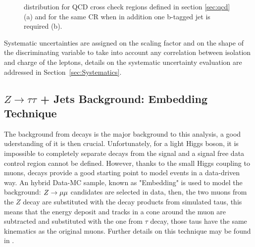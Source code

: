 \begin{figure}[tp]
	\begin{center}
	     
	
	\end{center}
	\caption{\mmc distribution for QCD cross check regions defined in section \ref{sec:qcd} (a) and for the same CR when in addition one b-tagged jet is required (b). }
	\label{fig:ABCD_cr}
\end{figure}


Systematic uncertainties are assigned on the scaling factor \rqcd and on the shape of
the discriminating variable \mmc to take into account any correlation between isolation and charge 
of the leptons, details on the systematic uncertainty evaluation are addressed in Section~\ref{sec:Systematics}.





\subsection{$Z \rightarrow \tau\tau$ + Jets Background: Embedding Technique}\label{sec:ztau}
The background from \Ztautau decays is the major background to this analysis, a good uderstanding 
of it is then crucial.
 Unfortunately, for a light Higgs boson, it is impossible to completely separate \Ztautau decays 
from the signal and a signal free data control region cannot be defined.
However, thanks to the small Higgs coupling to muons, \Zmumu decays provide a good starting point to 
model \Ztautau events in a data-driven way. An hybrid Data-MC sample, known as "Embedding" is used to model the \Ztautau background: 
$Z\rightarrow \mu\mu$ candidates are selected in data, then, the two muons from the $Z$ decay are substituted with the decay 
products from simulated taus, this means that the energy deposit and tracks in a cone around the muon are subtracted
and substituted with the one from $\tau$ decay, those taus have the same kinematics as the original muons. 
Further details on this technique may be found in \cite{Embedding, SMold}.

